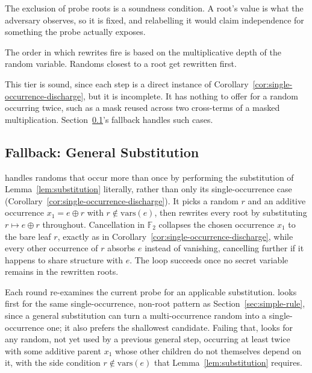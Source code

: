   The exclusion of probe roots is a soundness condition. A
  root's value is what the adversary observes, so it is fixed, and relabelling
  it would claim independence for something the probe actually exposes.

  The order in which rewrites fire is based on the multiplicative depth of the random variable.
  Randoms closest to a root get rewritten first.

  This tier is sound, since each step is a direct instance of
  Corollary~\ref{cor:single-occurrence-discharge}, but it is incomplete. It has nothing to
  offer for a random occurring twice, such as a mask reused across two cross-terms of a
  masked multiplication. Section~\ref{sec:general-substitution}'s fallback handles
  such cases.

  \subsection{Fallback: General Substitution}
  \label{sec:general-substitution}

   handles randoms that occur more than once by performing
  the substitution of Lemma~\ref{lem:substitution} literally, rather than only its
  single-occurrence case (Corollary~\ref{cor:single-occurrence-discharge}). It picks
  a random $r$ and an additive occurrence $x_1 = e \oplus r$ with
  $r \notin \mathrm{vars}(e)$, then rewrites every root by substituting
  $r \mapsto e \oplus r$ throughout. Cancellation in $\mathbb{F}_2$ collapses the
  chosen occurrence $x_1$ to the bare leaf $r$, exactly as in
  Corollary~\ref{cor:single-occurrence-discharge}, while every other occurrence of
  $r$ absorbs $e$ instead of vanishing, cancelling further if it happens to share
  structure with $e$. The loop succeeds once no secret variable remains in
  the rewritten roots.

  Each round re-examines the current probe for an applicable substitution.
   looks first for the same single-occurrence, non-root pattern
  as Section~\ref{sec:simple-rule}, since a general substitution can turn a
  multi-occurrence random into a single-occurrence one; it also prefers the shallowest
  candidate. Failing that,  looks for any random, not yet used
  by a previous general step, occurring at least twice with some additive parent
  $x_1$ whose other children do not themselves depend on it, with the side condition
  $r \notin \mathrm{vars}(e)$ that Lemma~\ref{lem:substitution} requires.

